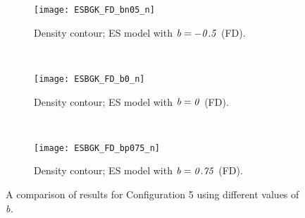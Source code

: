 \documentclass{rsproca}%
\begin{document}
\begin{figure}
				\begin{subfigure}[b]{0.32\textwidth}
                \centering
                \texttt{[image: ESBGK\_FD\_bn05\_n]}
                \caption{Density contour; ES model with $\it{b=-0.5}$ (FD).}
                \label{fig:ESBGK_FD_bn05_n}
        \end{subfigure}%
        ~ %
        \begin{subfigure}[b]{0.32\textwidth}
                \centering
                \texttt{[image: ESBGK\_FD\_b0\_n]}
                \caption{Density contour; ES model with $\it{b=0}$ (FD).}
                \label{fig:ESBGK_FD_b0_n}
        \end{subfigure}
        ~ %
        \begin{subfigure}[b]{0.32\textwidth}
                \centering
                \texttt{[image: ESBGK\_FD\_bp075\_n]}
                \caption{Density contour; ES model with $\it{b=0.75}$ (FD).}
                \label{fig:ESBGK_FD_bp075_n}
        \end{subfigure}	
        \caption{A comparison of results for Configuration 5 using different values of \it{b}.}
				\label{fig:test_b_parameter}
\end{figure}
\end{document}

